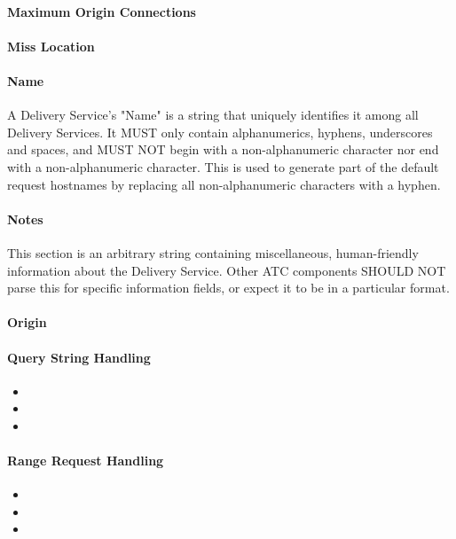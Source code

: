 \paragraph{Maximum Origin Connections}


\paragraph{Miss Location}

\paragraph{Name}
A Delivery Service's "Name" is a string that uniquely identifies it among all
Delivery Services. It MUST only contain alphanumerics, hyphens, underscores and
spaces, and MUST NOT begin with a non-alphanumeric character nor end with a
non-alphanumeric character. This is used to generate part of the default request
hostnames by replacing all non-alphanumeric characters with a hyphen.

\paragraph{Notes}
This section is an arbitrary string containing miscellaneous, human-friendly
information about the Delivery Service. Other ATC components SHOULD NOT parse
this for specific information fields, or expect it to be in a particular format.

\paragraph{Origin}

\paragraph{Query String Handling}

\begin{itemize}
	\item {}
	\item {}
	\item {}
\end{itemize}

\paragraph{Range Request Handling}
\begin{itemize}
	\item {}
	\item {}
	\item {}
\end{itemize}

